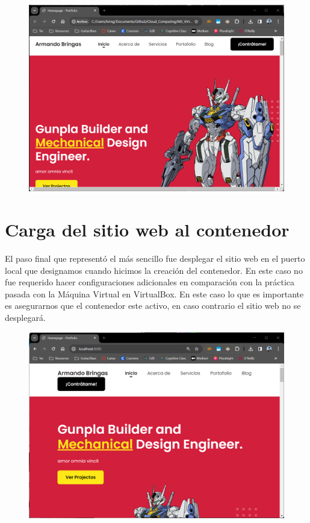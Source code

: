 \documentclass[12pt,a4paper]{article}
\begin{document}
\begin{figure}[H]
    \centering
    \includegraphics[width=.75\linewidth]{M3_Virtualización_y_Contenedores/Tarea_3_Creación_Contenedor_Docker/reporte/figuras/5-2_Personalización_Sitio_Web.png}
    \label{fig:Personalización_web_2}
\end{figure}


\section{Carga del sitio web al contenedor}

El paso final que representó el más sencillo fue desplegar el sitio web en el puerto local  que designamos cuando hicimos la creación del contenedor. En este caso no fue requerido hacer configuraciones adicionales en comparación con la práctica pasada con la Máquina Virtual en VirtualBox. En este caso lo que es importante es asegurarnos que el contenedor este activo, en caso contrario el sitio web no se desplegará.

\begin{figure}[H]
    \centering
    \includegraphics[width=1\linewidth]{M3_Virtualización_y_Contenedores/Tarea_3_Creación_Contenedor_Docker/reporte/figuras/6-1_Carga del_Sitio_Web.png}
    \label{fig:Carga_web_1}
\end{figure}
\end{document}

